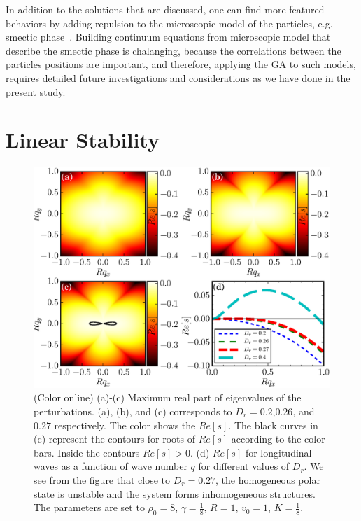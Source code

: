 \documentclass[reprint,floatfix,amsmath,amssymb,aps,pre,showkeys,showpacs,superscriptaddress]{revtex4-1}
\newcommand{\hl}[1]{\textcolor{hlcolor}{#1}}
\begin{document}
\hl{In addition to the solutions that are discussed, one can find more featured behaviors by adding repulsion to the microscopic model of the particles, e.g. smectic phase~\cite{Menzel2013unidirectional,Romanczuk2016emergent,Menzel2016on,Chen2013universality,Adhyapak2013live}. Building continuum equations from microscopic model that describe the smectic phase is chalanging, because the correlations between the particles positions are important, and therefore, applying the GA to such models, requires detailed future investigations and considerations as we have done in the present study.}

\section{Linear Stability}
\label{section:linear-stability}

\begin{figure}
	\centering
	\includegraphics[width=\columnwidth]{Fig7_linear-stability}
\caption{(Color online) (a)-(c) Maximum real part of eigenvalues of the perturbations. (a), (b), and (c) corresponds to $D_r=0.2$,$0.26$, and $0.27$ respectively. The color shows the $Re[s]$. The black curves in (c) represent the contours for roots of $Re[s]$ according to the color bars. Inside the contours $Re[s] > 0$. (d) $Re[s]$ for longitudinal waves as a function of wave number $q$ for different values of $D_r$. We see from the figure that close to $D_r=0.27$, the homogeneous polar state is unstable and the system forms inhomogeneous structures. The parameters are set to $\rho_0=8$, $\gamma=\tfrac{1}{8}$, $R=1$, $v_0=1$, $K=\tfrac{1}{8}$.}
\label{fig:s-map}
\end{figure}
\end{document}

